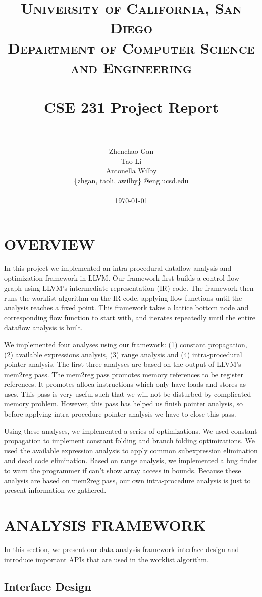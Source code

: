 \documentclass[paper=letter, fontsize=11pt]{scrartcl}
\title{
		\vspace{-0.5in} 	
		\usefont{OT1}{bch}{b}{n}
		\normalfont \normalsize \textsc{University of California, San Diego \\
								Department of Computer Science and Engineering } \\ [25pt]
		\horrule{0.5pt} \\[0.4cm]
		\huge CSE 231 Project Report\\
		\horrule{2pt} \\[0.5cm]
}
\author{
		\normalfont 						\normalsize
        				Zhenchao Gan\\[-3pt]		\normalsize
        				Tao Li\\[-3pt]				\normalsize
        				Antonella Wilby\\[-3pt]		\normalsize
				\{zhgan, taoli, awilby\} @eng.ucsd.edu \\ \\
       		 \today
}
\date{}
\numberwithin{equation}{section}		%
\numberwithin{figure}{section}			%
\numberwithin{table}{section}				%
\begin{document}
\maketitle
\section{OVERVIEW}

In this project we implemented an intra-procedural dataflow analysis and optimization framework in LLVM.  Our framework first builds a control flow graph using LLVM's intermediate representation (IR) code. The framework then runs the worklist algorithm on the IR code, applying flow functions until the analysis reaches a fixed point. This framework takes a lattice bottom node and corresponding flow function to start with, and iterates repeatedly until the entire dataflow analysis is built. 

We implemented four analyses using our framework: (1) constant propagation, (2) available expressions analysis, (3) range analysis and (4) intra-procedural pointer analysis. The first three analyses are based on the output of LLVM's mem2reg pass. The mem2reg pass promotes memory references to be register references. It promotes alloca instructions which only have loads and stores as uses. This pass is very useful such that we will not be disturbed by complicated memory problem. However, this pass has helped us finish pointer analysis, so before applying intra-procedure pointer analysis we have to close this pass.

Using these analyses, we implemented a series of optimizations. We used constant propagation to implement constant folding and branch folding optimizations. We used the available expression analysis to apply common subexpression elimination and dead code elimination.  Based on range analysis, we implemented a bug finder to warn the programmer if can’t show array access in bounds. Because these analysis are based on mem2reg pass, our own intra-procedure analysis is just to present information we gathered.


\section{ANALYSIS FRAMEWORK}

In this section, we present our data analysis framework interface design and introduce important APIs that are used in the worklist algorithm.

\subsection{Interface Design}
\end{document}
